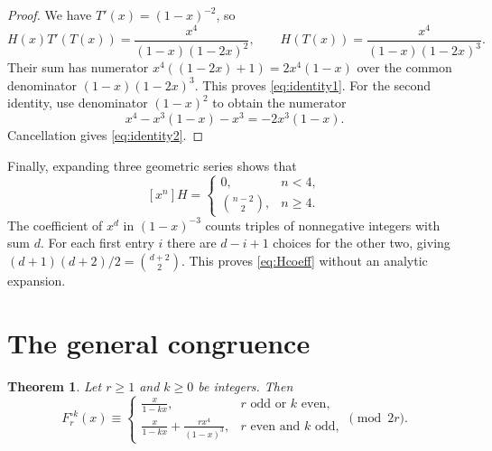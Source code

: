 \documentclass[11pt,a4paper]{article}
\newtheorem{theorem}{Theorem}[section]
\theoremstyle{remark}\newtheorem{remark}[theorem]{Remark}
\newcommand{\coeff}[2]{[x^{#1}]#2}
\begin{document}
\begin{proof}
We have $T'(x)=(1-x)^{-2}$, so
\[
H(x)T'(T(x))=\frac{x^4}{(1-x)(1-2x)^2},\qquad
H(T(x))=\frac{x^4}{(1-x)(1-2x)^3}.
\]
Their sum has numerator $x^4((1-2x)+1)=2x^4(1-x)$ over the
common denominator $(1-x)(1-2x)^3$. This proves
\eqref{eq:identity1}. For the second identity, use denominator
$(1-x)^2$ to obtain the numerator
\[
x^4-x^3(1-x)-x^3=-2x^3(1-x).
\]
Cancellation gives \eqref{eq:identity2}.
\end{proof}

Finally, expanding three geometric series shows that
\begin{equation}\label{eq:Hcoeff}
\coeff{n}{H}=
\begin{cases}
0,&n<4,\\
\binom{n-2}{2},&n\ge4.
\end{cases}
\end{equation}
The coefficient of $x^d$ in $(1-x)^{-3}$ counts triples of
nonnegative integers with sum $d$. For each first entry $i$ there
are $d-i+1$ choices for the other two, giving
$(d+1)(d+2)/2=\binom{d+2}{2}$. This proves
\eqref{eq:Hcoeff} without an analytic expansion.

\section{The general congruence}

\begin{theorem}\label{thm:general}
Let $r\ge1$ and $k\ge0$ be integers. Then
\begin{equation}\label{eq:general-congruence}
F_r^{\circ k}(x)\equiv
\begin{cases}
\displaystyle\frac{x}{1-kx},&r\text{ odd or }k\text{ even},\\[7pt]
\displaystyle\frac{x}{1-kx}+\frac{rx^4}{(1-x)^3},
&r\text{ even and }k\text{ odd},
\end{cases}
\pmod{2r}.
\end{equation}
\end{theorem}
\end{document}
